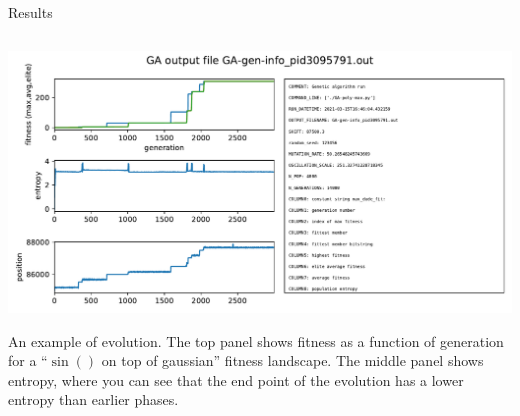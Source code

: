 \documentclass[handout,10pt,aspectratio=169]{beamer}
\begin{document}
\begin{frame}{Results}
  \begin{columns} %
    \begin{column}{0.4\textwidth}
      \includegraphics[width=\textwidth]{GA-gen-info_pid3095791.out.pdf}
                      {\tiny
                      	\begin{singlespace}
                      	 An example of evolution.  The top panel shows
                         fitness as a function of generation for a
                         ``$\sin()$ on top of gaussian'' fitness
                         landscape.  The middle panel shows entropy,
                         where you can see that the end point of the
                         evolution has a lower entropy than earlier
                         phases.
              			\end{singlespace}    
              }
    \end{column}


\end{columns}
\end{frame}
\end{document}
